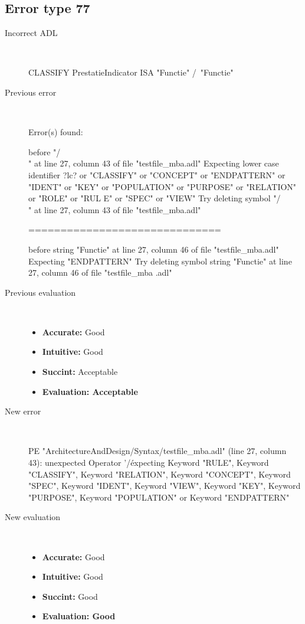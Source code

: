 \hrulefill

\subsection{Error type 77}
  \begin{description}
  \item[Incorrect ADL]~\\
\begin{adl}
CLASSIFY PrestatieIndicator ISA "Functie" /\ "Functie"\end{adl}
  \item[Previous error]~\\
\begin{haskell}
Error(s) found:

before "/\\" at line 27, column 43 of file "testfile_mba.adl"
Expecting lower case identifier ?lc? or "CLASSIFY" or "CONCEPT" or "ENDPATTERN"
or "IDENT" or "KEY" or "POPULATION" or "PURPOSE" or "RELATION" or "ROLE" or "RUL
E" or "SPEC" or "VIEW"
Try deleting symbol "/\\" at line 27, column 43 of file "testfile_mba.adl"

==============================

before string "Functie" at line 27, column 46 of file "testfile_mba.adl"
Expecting "ENDPATTERN"
Try deleting symbol string "Functie" at line 27, column 46 of file "testfile_mba
.adl"

\end{haskell}
  \item[Previous evaluation]~\\
    \begin{itemize}
    \item \textbf{Accurate:} Good
    \item \textbf{Intuitive:} Good
    \item \textbf{Succint:} Acceptable
    \item \textbf{Evaluation: Acceptable}
    \end{itemize}
  \item[New error]~\\
\begin{haskell}
PE "ArchitectureAndDesign/Syntax/testfile_mba.adl" (line 27, column 43):
unexpected Operator '/\'
expecting Keyword "RULE", Keyword "CLASSIFY", Keyword "RELATION", Keyword "CONCEPT", Keyword "SPEC", Keyword "IDENT", Keyword "VIEW", Keyword "KEY", Keyword "PURPOSE", Keyword "POPULATION" or Keyword "ENDPATTERN"
\end{haskell}
  \item[New evaluation]~\\
    \begin{itemize}
    \item \textbf{Accurate:} Good
    \item \textbf{Intuitive:} Good
    \item \textbf{Succint:} Good
    \item \textbf{Evaluation: Good
}
    \end{itemize}
  \end{description}

